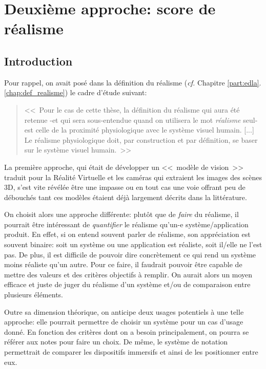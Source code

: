 \part{Deuxième approche: score de réalisme}
	\chapter*{Introduction}
	\par Pour rappel, on avait posé dans la définition du réalisme (\textit{cf.} Chapitre \ref{part:edla}.\ref{chap:def_realisme}) le cadre d'étude suivant:
	\begin{quote}
		<<~Pour le cas de cette thèse, la définition du réalisme qui aura été retenue -et qui sera sous-entendue quand on utilisera le mot \textit{réalisme} seul- est celle de la proximité physiologique avec le système visuel humain. [...] Le réalisme physiologique doit, par construction et par définition, se baser sur le système visuel humain.~>>
	\end{quote}
	La première approche, qui était de développer un <<~modèle de vision~>> traduit pour la Réalité Virtuelle et les caméras qui extraient les images des scènes 3D, s'est vite révélée être une impasse ou en tout cas une voie offrant peu de débouchés tant ces modèles étaient déjà largement décrits dans la littérature.
	
	\par On choisit alors une approche différente: plutôt que de \textit{faire} du réalisme, il pourrait être intéressant de \textit{quantifier} le réalisme qu'un-e système/application produit. En effet, si on entend souvent parler de réalisme, son appréciation est souvent binaire: soit un système ou une application est réaliste, soit il/elle ne l'est pas. De plus, il est difficile de pouvoir dire concrètement ce qui rend un système moins réaliste qu'un autre. Pour ce faire, il faudrait pouvoir être capable de mettre des valeurs et des critères objectifs à remplir. On aurait alors un moyen efficace et juste de juger du réalisme d'un système et/ou de comparaison entre plusieurs éléments.
	
	\par Outre sa dimension théorique, on anticipe deux usages potentiels à une telle approche: elle pourrait permettre de choisir un système pour un cas d'usage donné. En fonction des critères dont on a besoin principalement, on pourra se référer aux notes pour faire un choix. De même, le système de notation permettrait de comparer les dispositifs immersifs et ainsi de les positionner entre eux.